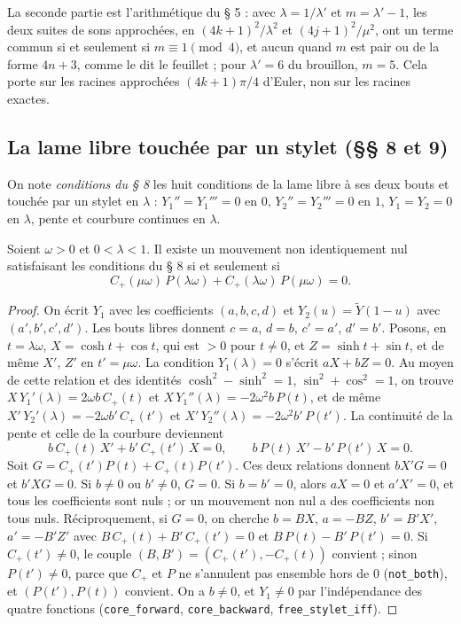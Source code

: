 \begin{remarque}
La seconde partie est l'arithmétique du § 5 : avec $\lambda = 1/\lambda'$ et $m = \lambda' - 1$, les deux suites de sons approchées, en $(4k+1)^2/\lambda^2$ et $(4j+1)^2/\mu^2$, ont un terme commun si et seulement si $m \equiv 1 \pmod 4$, et aucun quand $m$ est pair ou de la forme $4n+3$, comme le dit le feuillet ; pour $\lambda' = 6$ du brouillon, $m = 5$. Cela porte sur les racines approchées $(4k+1)\pi/4$ d'Euler, non sur les racines exactes.
\end{remarque}

\subsection*{La lame libre touchée par un stylet (§§ 8 et 9)}

On note \emph{conditions du § 8} les huit conditions de la lame libre à ses deux bouts et touchée par un stylet en $\lambda$ : $Y_1'' = Y_1''' = 0$ en $0$, $Y_2'' = Y_2''' = 0$ en $1$, $Y_1 = Y_2 = 0$ en $\lambda$, pente et courbure continues en $\lambda$.

\begin{enonce}
Soient $\omega > 0$ et $0 < \lambda < 1$. Il existe un mouvement non identiquement nul satisfaisant les conditions du § 8 si et seulement si
\[
C_+(\mu\omega)\,P(\lambda\omega) + C_+(\lambda\omega)\,P(\mu\omega) = 0 .
\]
\end{enonce}

\begin{proof}
On écrit $Y_1$ avec les coefficients $(a,b,c,d)$ et $Y_2(u) = \tilde Y(1-u)$ avec $(a',b',c',d')$. Les bouts libres donnent $c = a$, $d = b$, $c' = a'$, $d' = b'$. Posons, en $t = \lambda\omega$, $X = \cosh t + \cos t$, qui est $> 0$ pour $t \neq 0$, et $Z = \sinh t + \sin t$, et de même $X'$, $Z'$ en $t' = \mu\omega$. La condition $Y_1(\lambda) = 0$ s'écrit $aX + bZ = 0$. Au moyen de cette relation et des identités $\cosh^2 - \sinh^2 = 1$, $\sin^2 + \cos^2 = 1$, on trouve $X\,Y_1'(\lambda) = 2\omega b\,C_+(t)$ et $X\,Y_1''(\lambda) = -2\omega^2 b\,P(t)$, et de même $X'\,Y_2'(\lambda) = -2\omega b'\,C_+(t')$ et $X'\,Y_2''(\lambda) = -2\omega^2 b'\,P(t')$. La continuité de la pente et celle de la courbure deviennent
\[
b\,C_+(t)\,X' + b'\,C_+(t')\,X = 0, \qquad b\,P(t)\,X' - b'\,P(t')\,X = 0 .
\]
Soit $G = C_+(t')P(t) + C_+(t)P(t')$. Ces deux relations donnent $bX'G = 0$ et $b'XG = 0$. Si $b \neq 0$ ou $b' \neq 0$, $G = 0$. Si $b = b' = 0$, alors $aX = 0$ et $a'X' = 0$, et tous les coefficients sont nuls ; or un mouvement non nul a des coefficients non tous nuls. Réciproquement, si $G = 0$, on cherche $b = BX$, $a = -BZ$, $b' = B'X'$, $a' = -B'Z'$ avec $B\,C_+(t) + B'\,C_+(t') = 0$ et $B\,P(t) - B'\,P(t') = 0$. Si $C_+(t') \neq 0$, le couple $(B, B') = (C_+(t'), -C_+(t))$ convient ; sinon $P(t') \neq 0$, parce que $C_+$ et $P$ ne s'annulent pas ensemble hors de $0$ (\texttt{not\_both}), et $(P(t'), P(t))$ convient. On a $b \neq 0$, et $Y_1 \neq 0$ par l'indépendance des quatre fonctions (\texttt{core\_forward}, \texttt{core\_backward}, \texttt{free\_stylet\_iff}).
\end{proof}

